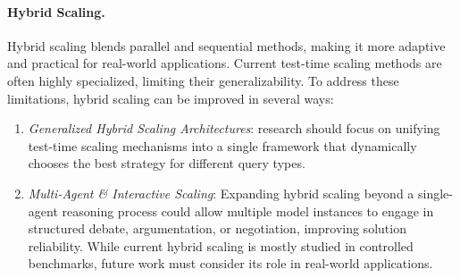 \paragraph{Hybrid Scaling.} Hybrid scaling blends parallel and sequential methods, making it more adaptive and practical for real-world applications. Current test-time scaling methods are often highly specialized, limiting their generalizability.
To address these limitations, hybrid scaling can be improved in several ways:
\begin{enumerate}
    \item \textit{Generalized Hybrid Scaling Architectures}: research should focus on unifying test-time scaling mechanisms into a single framework that dynamically chooses the best strategy for different query types.
    \item \textit{Multi-Agent \& Interactive Scaling}: Expanding hybrid scaling beyond a single-agent reasoning process could allow multiple model instances to engage in structured debate, argumentation, or negotiation, improving solution reliability. While current hybrid scaling is mostly studied in controlled benchmarks, future work must consider its role in real-world applications.
\end{enumerate}

